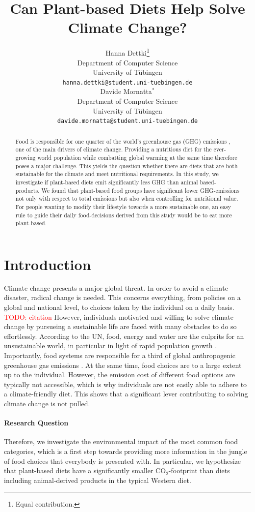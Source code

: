 \documentclass{article}
\title{Can Plant-based Diets Help Solve Climate Change?}
\author{%
  Hanna Dettki\thanks{Equal contribution.} \\
  Department of Computer Science\\
  University of Tübingen\\
  \texttt{hanna.dettki@student.uni-tuebingen.de} \\
  \And
  Davide Mornatta$^{*}$  \\
  Department of Computer Science\\
  University of Tübingen\\
  \texttt{davide.mornatta@student.uni-tuebingen.de} \\
}
\begin{document}
\maketitle

\begin{abstract}
  Food is responsible for one quarter of the world's greenhouse gas (GHG) emissions \cite{Poore2018}, one of the main drivers of climate change. Providing a nutritious diet for the ever-growing world population while combatting global warming at the same time therefore poses a major challenge. This yields the question whether there are diets that are both sustainable for the climate and meet  nutritional requirements. In this study, we investigate if plant-based diets  emit significantly less GHG than animal based-products. We found  that plant-based food groups have significant lower GHG-emissions not only with respect to total emissions but also when controlling for nutritional value. For people wanting to  modify their lifestyle towards a more sustainable one, an easy rule to guide their daily food-decisions derived from this study would be to eat more plant-based.
\end{abstract}

\section{Introduction}

Climate change presents a major global threat. In order to avoid a climate disaster, radical change is needed. This concerns everything, from policies on a global and national level, to choices taken by the individual on a daily basis. \textcolor{red}{TODO: citation}
However, individuals motivated and willing to solve climate change by pursueing a sustainable life are faced with many obstacles to do so effortlessly. According to the UN, food, energy and water are the culprits for an unsustainable world, in particular in light of rapid population growth \cite{Ritchie2020}.
 Importantly, food systems are responsible for a third of global anthropogenic greenhouse gas emissions \cite{Crippa2021}. At the same time, food choices are to a large extent up to the individual.  However,  the emission cost of different food options are  typically not accessible, which is why individuals are  not easily able to adhere to  a climate-friendly diet. This shows that a significant lever contributing to solving climate change is not pulled.
\paragraph*{Research Question}
Therefore, we investigate the environmental impact of the most common food categories, which is a first step towards  providing more information in the jungle of food choices that everybody is presented with. In particular, we hypothesize that  plant-based diets  have a significantly smaller CO$_2$-footprint than  diets including animal-derived products in the typical Western diet.
\end{document}
